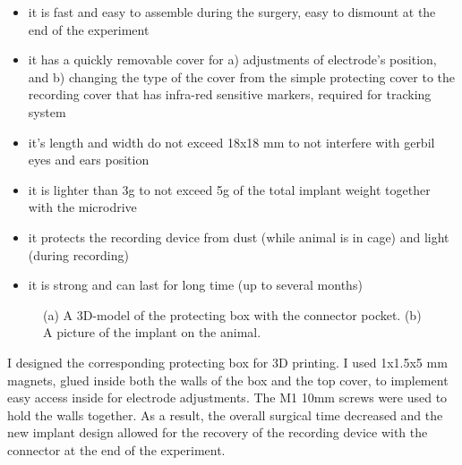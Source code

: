 \begin{itemize}
    \item it is fast and easy to assemble during the surgery, easy to dismount at the end of the experiment
    \item it has a quickly removable cover for a) adjustments of electrode’s position, and b) changing the type of the cover from the simple protecting cover to the recording cover that has infra-red sensitive markers, required for tracking system
    \item it’s length and width do not exceed 18x18 mm to not interfere with gerbil eyes and ears position
    \item it is lighter than 3g to not exceed 5g of the total implant weight together with the microdrive
    \item it protects the recording device from dust (while animal is in cage) and light (during recording)
    \item it is strong and can last for long time (up to several months)
\end{itemize}

\begin{figure}
\captionsetup{format=plain}
\caption[Protecting box]{
(a) A 3D-model of the protecting box with the connector pocket. (b) A picture of the implant on the animal.
}
\label{fig:F30_crown}
\end{figure}

I designed the corresponding protecting box for 3D printing. I used 1x1.5x5 mm magnets, glued inside both the walls of the box and the top cover, to implement easy access inside for electrode adjustments. The M1 10mm screws were used to hold the walls together. As a result, the overall surgical time decreased and the new implant design allowed for the recovery of the recording device with the connector at the end of the experiment.

